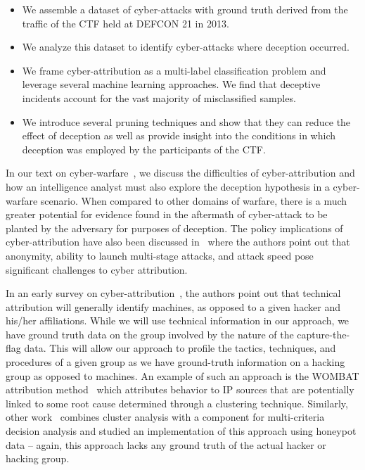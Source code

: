 \documentclass[conference]{IEEEtran}
\begin{document}
\begin{itemize}
	\item We assemble a dataset of cyber-attacks with ground truth derived from the traffic of the CTF held at DEFCON 21 in 2013.
	\item We analyze this dataset to identify cyber-attacks where deception occurred.
	\item We frame cyber-attribution as a multi-label classification problem and leverage several machine learning approaches. We find that deceptive incidents account for the vast majority of misclassified samples.
	\item We introduce several pruning techniques and show that they can reduce the effect of deception as well as provide insight into the conditions in which deception was employed by the participants of the CTF.
\end{itemize}

In our text on cyber-warfare~\cite{warfare}, we discuss the difficulties of cyber-attribution and how an intelligence analyst must also explore the deception hypothesis in a cyber-warfare scenario.  When compared to other domains of warfare, there is a much greater potential for evidence found in the aftermath of cyber-attack to be planted by the adversary for purposes of deception.  The policy implications of cyber-attribution have also been discussed in~\cite{policy} where the authors point out that anonymity, ability to launch multi-stage attacks, and attack speed pose significant challenges to cyber attribution.

In an early survey on cyber-attribution~\cite{survey}, the authors point out that technical attribution will generally identify machines, as opposed to a given hacker and his/her affiliations.  While we will use technical information in our approach, we have ground truth data on the group involved by the nature of the capture-the-flag data.  This will allow our approach to profile the tactics, techniques, and procedures of a given group as we have ground-truth information on a hacking group as opposed to machines.  An example of such an approach is the WOMBAT attribution method~\cite{wombat} which attributes behavior to IP sources that are potentially linked to some root cause determined through a clustering technique.  Similarly, other work~\cite{Thonnard} combines cluster analysis with a component for multi-criteria decision analysis and studied an implementation of this approach using honeypot data -- again, this approach lacks any ground truth of the actual hacker or hacking group.
\end{document}
